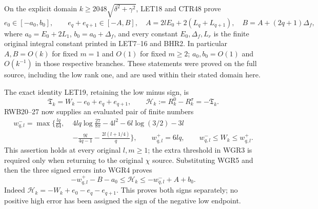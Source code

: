 \documentclass[11pt,a4paper]{article}
\begin{document}
On the explicit domain $k\ge2048\sqrt{\delta^2+\gamma^2}$,
LET18 and CTR48 prove
\[
 e_0\in[-a_0,b_0],\qquad e_q+e_{q+1}\in[-A,B],
 \quad A=2lE_0+2(L_q+L_{q+1}),\quad
 B=A+(2q+1)\Delta_f,
 \tag{WGR3}
\]
where $a_0=E_0+2L_1$, $b_0=a_0+\Delta_f$, and every constant
$E_0,\Delta_f,L_r$ is the finite original integral constant printed
in LET7--16 and BHR2. In particular $A,B=O(k)$ for fixed $m=1$
and $O(1)$ for fixed $m\ge2$; $a_0,b_0=O(1)$ and $O(k^{-1})$
in those respective branches. These statements were proved on the
full source, including the low rank one, and are used within their
stated domain here.

The exact identity LET19, retaining the low minus sign, is
\[
 \mathfrak T_k=W_k-e_0+e_q+e_{q+1},\qquad
 \mathcal H_k:=R_k^0-R_k^\sigma=-\mathfrak T_k.
 \tag{WGR4}
\]
RWB20--27 now supplies an evaluated pair of finite numbers
\[
 \begin{aligned}
 w^-_{q,l}=\max\bigg\{\frac{lq}{64},\;&
 4lq\log\frac{27}{8\pi}-4l^2-6l\log(3/2)-3l\\
 &-\frac{9l}{4q-1}-\frac{2l(l+1/4)}q\bigg\},
 \qquad w^+_{q,l}=6lq,\qquad
 w^-_{q,l}\le W_k\le w^+_{q,l}.
 \end{aligned}\tag{WGR5}
\]
This assertion holds at every original $l,m\ge1$; the extra threshold
in WGR3 is required only when returning to the original $\chi$ source.
Substituting WGR5 and then the three signed errors into WGR4 proves
\[
 \boxed{-w^+_{q,l}-B-a_0\le\mathcal H_k
                 \le-w^-_{q,l}+A+b_0.}
 \tag{WGR6}
\]
Indeed $\mathcal H_k=-W_k+e_0-e_q-e_{q+1}$.
This proves both signs separately; no positive high error has been
assigned the sign of the negative low endpoint.
\end{document}
